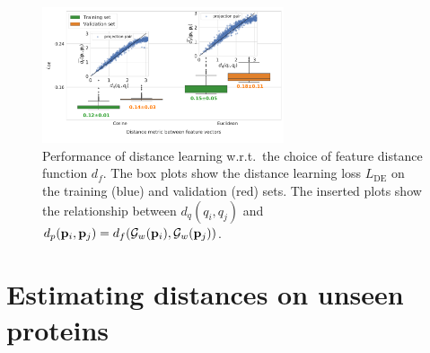 \begin{figure}[ht!]
    \hfill
    \begin{minipage}[t]{0.43\linewidth}
        \centering
        \includegraphics[height=4cm]{figures/dPdQ_feat_distances.pdf}
        \caption{%
            Performance of distance learning w.r.t.\ the choice of feature distance function $d_f$.
            The box plots show the distance learning loss $L_\text{DE}$  on the training (blue) and validation (red) sets.
            The inserted plots show the relationship between $d_q(q_i, q_j)$ and $d_p(\mathbf{p}_i, \mathbf{p}_j) = d_f(\mathcal{G}_w(\mathbf{p}_i), \mathcal{G}_w(\mathbf{p}_j))$.
        }\label{fig:geo-eucl-mlp}
    \end{minipage}
\end{figure}

\section{Estimating distances on unseen proteins}\label{apx:unseen-proteins}

